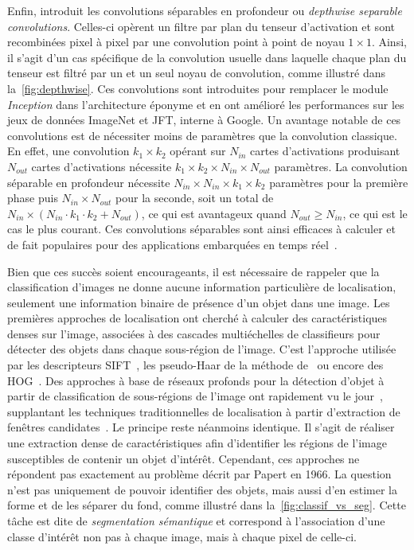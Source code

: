 Enfin, \citet{chollet_xception_2017} introduit les convolutions séparables en profondeur ou \emph{depthwise separable convolutions}. Celles-ci opèrent un filtre par plan du tenseur d'activation et sont recombinées pixel à pixel par une convolution point à point de noyau $1\times1$. Ainsi, il s'agit d'un cas spécifique de la convolution usuelle dans laquelle chaque plan du tenseur est filtré par un et un seul noyau de convolution, comme illustré dans la~\cref{fig:depthwise}. Ces convolutions sont introduites pour remplacer le module \emph{Inception} dans l'architecture éponyme et en ont amélioré les performances sur les jeux de données ImageNet et JFT, interne à Google. Un avantage notable de ces convolutions est de nécessiter moins de paramètres que la convolution classique. En effet, une convolution $k_1 \times k_2$ opérant sur $N_{in}$ cartes d'activations produisant $N_{out}$ cartes d'activations nécessite $k_1 \times k_2 \times N_{in} \times N_{out}$ paramètres. La convolution séparable en profondeur nécessite $N_{in} \times N_{in} \times k_1 \times k_2$ paramètres pour la première phase puis $N_{in} \times N_{out}$ pour la seconde, soit un total de $N_{in} \times (N_{in} \cdot k_1 \cdot k_2 + N_{out})$, ce qui est avantageux quand $N_{out} \ge N_{in}$, ce qui est le cas le plus courant. Ces convolutions séparables sont ainsi efficaces à calculer et de fait populaires pour des applications embarquées en temps réel~\cite{howard_mobilenets_2017}.

Bien que ces succès soient encourageants, il est nécessaire de rappeler que la classification d'images ne donne aucune information particulière de localisation, seulement une information binaire de présence d'un objet dans une image. Les premières approches de localisation ont cherché à calculer des caractéristiques denses sur l'image, associées à des cascades multiéchelles de classifieurs pour détecter des objets dans chaque sous-région de l'image. C'est l'approche utilisée par les descripteurs \gls{SIFT}~\cite{lowe_object_1999}, les pseudo-Haar de la méthode de~\citet{viola_robust_2001} ou encore des \gls{HOG}~\cite{dalal_histograms_2005}. Des approches à base de réseaux profonds pour la détection d'objet à partir de classification de sous-régions de l'image ont rapidement vu le jour~\cite{girshick_rich_2014,liu_ssd_2016,girshick_region-based_2016}, supplantant les techniques traditionnelles de localisation à partir d'extraction de fenêtres candidates~\cite{gu_recognition_2009,uijlings_selective_2013}. Le principe reste néanmoins identique. Il s'agit de réaliser une extraction dense de caractéristiques afin d'identifier les régions de l'image susceptibles de contenir un objet d'intérêt. Cependant, ces approches ne répondent pas exactement au problème décrit par Papert en 1966. La question n'est pas uniquement de pouvoir identifier des objets, mais aussi d'en estimer la forme et de les séparer du fond, comme illustré dans la~\cref{fig:classif_vs_seg}. Cette tâche est dite de \emph{segmentation sémantique} et correspond à l'association d'une classe d'intérêt non pas à chaque image, mais à chaque pixel de celle-ci.

